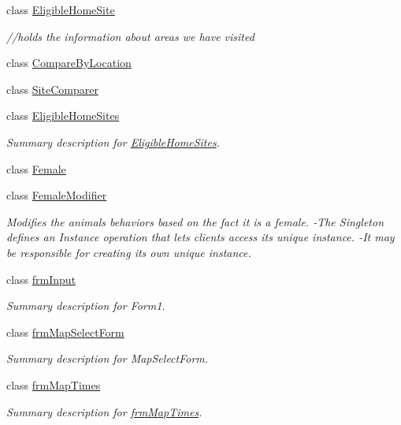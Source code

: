 \begin{DoxyCompactItemize}
class \hyperlink{class_p_a_z___dispersal_1_1_eligible_home_site}{Eligible\-Home\-Site}
\begin{DoxyCompactList}\small\item\em //holds the information about areas we have visited \end{DoxyCompactList}\item 
class \hyperlink{class_p_a_z___dispersal_1_1_compare_by_location}{Compare\-By\-Location}
\item 
class \hyperlink{class_p_a_z___dispersal_1_1_site_comparer}{Site\-Comparer}
\item 
class \hyperlink{class_p_a_z___dispersal_1_1_eligible_home_sites}{Eligible\-Home\-Sites}
\begin{DoxyCompactList}\small\item\em Summary description for \hyperlink{class_p_a_z___dispersal_1_1_eligible_home_sites}{Eligible\-Home\-Sites}. \end{DoxyCompactList}\item 
class \hyperlink{class_p_a_z___dispersal_1_1_female}{Female}
\item 
class \hyperlink{class_p_a_z___dispersal_1_1_female_modifier}{Female\-Modifier}
\begin{DoxyCompactList}\small\item\em Modifies the animals behaviors based on the fact it is a female. -\/\-The Singleton defines an Instance operation that lets clients access its unique instance. -\/\-It may be responsible for creating its own unique instance. \end{DoxyCompactList}\item 
class \hyperlink{class_p_a_z___dispersal_1_1frm_input}{frm\-Input}
\begin{DoxyCompactList}\small\item\em Summary description for Form1. \end{DoxyCompactList}\item 
class \hyperlink{class_p_a_z___dispersal_1_1frm_map_select_form}{frm\-Map\-Select\-Form}
\begin{DoxyCompactList}\small\item\em Summary description for Map\-Select\-Form. \end{DoxyCompactList}\item 
class \hyperlink{class_p_a_z___dispersal_1_1frm_map_times}{frm\-Map\-Times}
\begin{DoxyCompactList}\small\item\em Summary description for \hyperlink{class_p_a_z___dispersal_1_1frm_map_times}{frm\-Map\-Times}. \end{DoxyCompactList}\item 

\end{DoxyCompactItemize}

